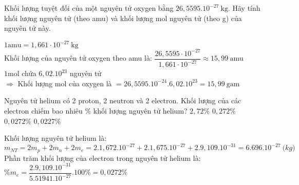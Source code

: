 \begin{vdex}[2]
	Khối lượng tuyệt đối của một nguyên tử oxygen bằng $26,5595.10^{-27} \mathrm{~kg}$. Hãy tính khối lượng nguyên tử (theo amu) và khối lượng mol nguyên tử (theo g) của nguyên tử này.
	\loigiai
	{%
		$
		1 \mathrm{amu}=1,661 \cdot 10^{-27} \mathrm{~kg}
		$\\
		
		
		Khối lượng của nguyên tử oxygen theo amu là:
		$
		\dfrac{26,5595 \cdot 10^{-27}}{1,661 \cdot 10^{-27}} \approx 15,99~ \mathrm{amu}
		$\\
		
		$1 \mathrm{mol}$ chứa $ 6,02.10^{23} $ nguyên tử\\
		$\Rightarrow$ Khối lượng mol của oxygen là  $=26,5595.10^{-24}.6,02.10^{23}= 15,99~ \mathrm{gam} $
		
	}
\end{vdex}


\begin{vdex}[2]
	Nguyên tử helium có 2 proton, 2 neutron và 2 electron. Khối lượng của các electron chiếm bao nhiêu $\%$ khối lượng nguyên tử helium?
	\choice
{%
	$2,72 \%$
}
{%
	$0,272 \%$
}
{%
\True	$0,0272 \%$
}
{%
	$0,0227 \%$
}
	\huongdan
	{%
		Khối lượng nguyên tử helium là:\\ $ m_{NT} = 2m_{p} + 2m_{n} + 2m_{e} = 2.1,672.10^{-27} + 2.1,675.10^{-27} + 2 .9,109.10^{-31} = 6.696.10^{-27}~\mathrm (kg) $\\
		Phần trăm khối lượng của electron trong nguyên tử helium là:\\
		$ \%m_{e}=\dfrac{2 .9,109.10^{-31}}{5.51941.10^{-27}}.100\%=0,0272 \%$
		
	}
\end{vdex}



